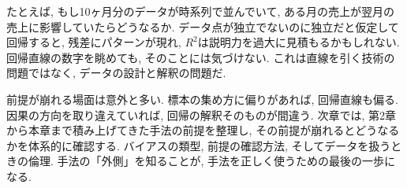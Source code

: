 たとえば, もし10ヶ月分のデータが時系列で並んでいて, ある月の売上が翌月の売上に影響していたらどうなるか.
データ点が独立でないのに独立だと仮定して回帰すると, 残差にパターンが現れ, $R^2$は説明力を過大に見積もるかもしれない.
回帰直線の数字を眺めても, そのことには気づけない.
これは直線を引く技術の問題ではなく, データの設計と解釈の問題だ.

前提が崩れる場面は意外と多い.
標本の集め方に偏りがあれば, 回帰直線も偏る.
因果の方向を取り違えていれば, 回帰の解釈そのものが間違う.
次章では, 第2章から本章まで積み上げてきた手法の前提を整理し, その前提が崩れるとどうなるかを体系的に確認する.
バイアスの類型, 前提の確認方法, そしてデータを扱うときの倫理.
手法の「外側」を知ることが, 手法を正しく使うための最後の一歩になる.
